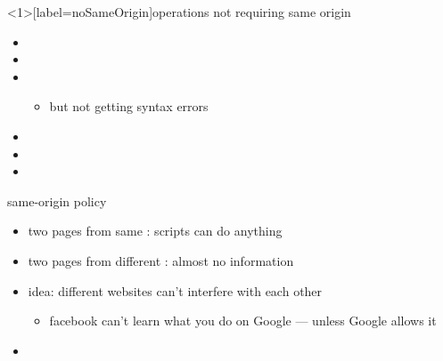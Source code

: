 \begin{frame}<1>[label=noSameOrigin]{operations not requiring same origin}
    \begin{itemize}
    \item {}
    \item {}
    \item {}
        \begin{itemize}
        \item but not getting syntax errors
        \end{itemize}
    \item {}
    \item {}
    \item {}
    \end{itemize}
\end{frame}
\begin{frame}{same-origin policy}
    \begin{itemize}
        \item two pages from same : scripts can do anything
        \item two pages from different : almost no information
            \vspace{.5cm}
        \item idea: different websites can't interfere with each other
            \begin{itemize}
            \item facebook can't learn what you do on Google --- unless Google allows it
            \end{itemize}
        \item {}
    \end{itemize}
\end{frame}

